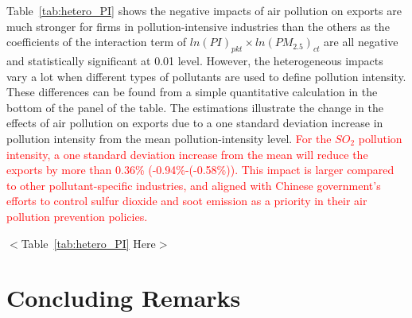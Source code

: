 \documentclass[12pt]{article}
\begin{document}
  Table~\ref{tab:hetero_PI} shows the negative impacts of air pollution
  on exports are much stronger for firms in pollution-intensive industries than the
  others as the coefficients of the interaction term of $ln(PI)_{pkt}\times ln(PM_{2.5})_{ct}$ 
  are all negative and statistically significant at 0.01 level. However, the heterogeneous impacts vary a 
  lot when different types of pollutants are used to define pollution intensity. These differences can be found from a simple quantitative calculation in the bottom of the panel of the table. The estimations
  illustrate the change in the effects of air pollution on exports due to a one standard deviation increase in pollution intensity from the mean pollution-intensity level.  \textcolor{red}{For the $SO_{2}$ pollution intensity, a one standard deviation increase from the mean will reduce the exports by more than 0.36\% (-0.94\%-(-0.58\%)). This impact is larger compared to other pollutant-specific industries, and aligned with Chinese government's efforts to control sulfur dioxide and soot emission as a priority in their air pollution prevention policies.}
  

  \begin{center}
    $<$Table~\ref{tab:hetero_PI} Here$>$
    \end{center}


\section{Concluding Remarks}
\end{document}
